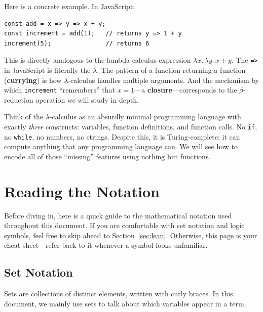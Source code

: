 \documentclass[11pt,a4paper]{article}
\theoremstyle{definition}
\newcommand{\lam}{\lambda}
\begin{document}
Here is a concrete example. In JavaScript:
\begin{verbatim}
const add = x => y => x + y;
const increment = add(1);   // returns y => 1 + y
increment(5);               // returns 6
\end{verbatim}

This is directly analogous to the lambda calculus expression $\lam x.\,\lam y.\, x + y$.
The \texttt{=>} in JavaScript is literally the $\lam$. The pattern of a
function returning a function (\textbf{currying}) is how $\lam$-calculus
handles multiple arguments. And the mechanism by which \texttt{increment}
``remembers'' that $x = 1$---a \textbf{closure}---corresponds to the
$\beta$-reduction operation we will study in depth.

\begin{intuition}
Think of the $\lam$-calculus as an absurdly minimal programming language with
exactly \emph{three} constructs: variables, function definitions, and function
calls. No \texttt{if}, no \texttt{while}, no numbers, no strings. Despite this,
it is Turing-complete: it can compute anything that any programming language
can. We will see how to encode all of those ``missing'' features using nothing
but functions.
\end{intuition}

\section{Reading the Notation}\label{sec:notation}

Before diving in, here is a quick guide to the mathematical notation used
throughout this document. If you are comfortable with set notation and logic
symbols, feel free to skip ahead to Section~\ref{sec:lean}. Otherwise, this
page is your cheat sheet---refer back to it whenever a symbol looks unfamiliar.

\subsection{Set Notation}

Sets are collections of distinct elements, written with curly braces. In this
document, we mainly use sets to talk about which variables appear in a term.
\end{document}
